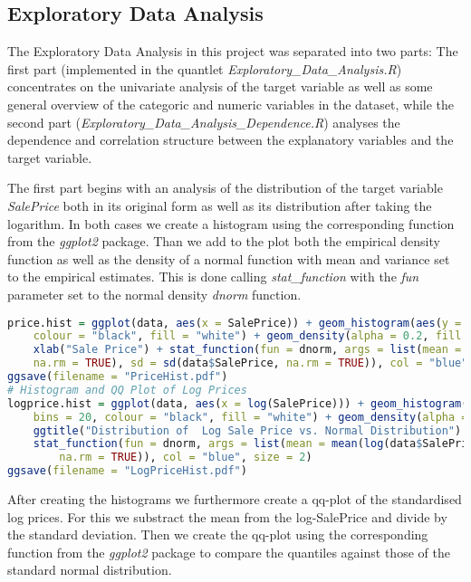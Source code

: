 \subsection{Exploratory Data Analysis}
The Exploratory Data Analysis in this project was separated into two parts: The first part (implemented in the quantlet \textit{Exploratory\_Data\_Analysis.R}) concentrates on the univariate analysis of the target variable as well as some general overview of the categoric and numeric variables in the dataset, while the second part (\textit{Exploratory\_Data\_Analysis\_Dependence.R}) analyses the dependence and correlation structure between the explanatory variables and the target variable. 

The first part begins with an analysis of the distribution of the target variable \textit{SalePrice} both in its original form as well as its distribution after taking the logarithm. In both cases we create a histogram using the corresponding function from the \textit{ggplot2} package. Than we add to the plot both the empirical density function as well as the density of a normal function with mean and variance set to the empirical estimates. This is done calling  \textit{stat\_function} with the \textit{fun} parameter set to the normal density \textit{dnorm} function.
\begin{lstlisting}[language=R]
price.hist = ggplot(data, aes(x = SalePrice)) + geom_histogram(aes(y = ..density..), bins = 20, 
    colour = "black", fill = "white") + geom_density(alpha = 0.2, fill = "#FF6666") + ggtitle("Distribution of Sale Price vs. Normal Distribution") + 
    xlab("Sale Price") + stat_function(fun = dnorm, args = list(mean = mean(data$SalePrice, 
    na.rm = TRUE), sd = sd(data$SalePrice, na.rm = TRUE)), col = "blue", size = 2)
ggsave(filename = "PriceHist.pdf")
# Histogram and QQ Plot of Log Prices
logprice.hist = ggplot(data, aes(x = log(SalePrice))) + geom_histogram(aes(y = ..density..), 
    bins = 20, colour = "black", fill = "white") + geom_density(alpha = 0.2, fill = "#FF6666") + 
    ggtitle("Distribution of  Log Sale Price vs. Normal Distribution") + xlab("Log Sale Price") + 
    stat_function(fun = dnorm, args = list(mean = mean(log(data$SalePrice), na.rm = TRUE), sd = sd(log(data$SalePrice), 
        na.rm = TRUE)), col = "blue", size = 2)
ggsave(filename = "LogPriceHist.pdf")
\end{lstlisting}
After creating the histograms we furthermore create a qq-plot of the standardised log prices. For this we substract the mean from the log-SalePrice and divide by the standard deviation. Then we create the qq-plot using the corresponding function from the \textit{ggplot2} package to compare the quantiles against those of the standard normal distribution.

